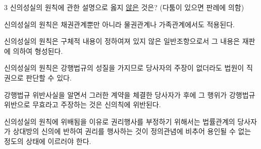 \begin{question}{3}
신의성실의 원칙에 관한 설명으로 옳지 \uline{않은} 것은? (다툼이 있으면 판례에 의함)
\begin{choices}
  \item 신의성실의 원칙은 채권관계뿐만 아니라 물권관계나 가족관계에서도 적용된다.
  \item 신의성실의 원칙은 구체적 내용이 정하여져 있지 않은 일반조항으로서 그 내용은 재판에 의하여 형성된다.
  \item 신의성실의 원칙은 강행법규의 성질을 가지므로 당사자의 주장이 없더라도 법원이 직권으로 판단할 수 있다.
  \item 강행법규 위반사실을 알면서 그러한 계약을 체결한 당사자가 후에 그 행위가 강행법규 위반으로 무효라고 주장하는 것은 신의칙에 위반된다.
  \item 신의성실의 원칙에 위배됨을 이유로 권리행사를 부정하기 위해서는 법률관계의 당사자가 상대방의 신의에 반하여 권리를 행사하는 것이 정의관념에 비추어 용인될 수 없는 정도의 상태에 이르러야 한다.
\end{choices}
\end{question}

